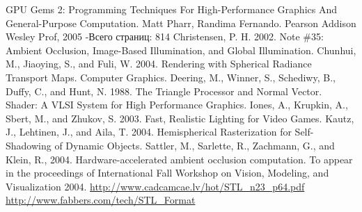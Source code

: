 \clearpage


\setcounter{page}{2} 





\clearpage
\begin{thebibliography}{00}
 GPU Gems 2: Programming Techniques For High-Performance Graphics And General-Purpose Computation. Matt Pharr, Randima Fernando. Pearson Addison Wesley Prof, 2005  -Всего страниц: 814
 Christensen, P. H. 2002. Note \#35: Ambient Occlusion, Image-Based Illumination, and Global Illumination.
 Chunhui, M., Jiaoying, S., and Fuli, W. 2004. Rendering with Spherical Radiance Transport Maps. Computer Graphics.
 Deering, M., Winner, S., Schediwy, B., Duffy, C., and Hunt, N. 1988. The Triangle Processor and Normal Vector. Shader: A VLSI System for High Performance Graphics.
 Iones, A., Krupkin, A., Sbert, M., and Zhukov, S. 2003. Fast, Realistic Lighting for Video Games.
 Kautz, J., Lehtinen, J., and Aila, T.  2004.  Hemispherical Rasterization for Self-Shadowing of Dynamic Objects.
 Sattler, M., Sarlette, R., Zachmann, G., and Klein, R., 2004. Hardware-accelerated ambient occlusion computation. To appear in the proceedings of International Fall Workshop on Vision, Modeling, and Visualization 2004.
 \url{http://www.cadcamcae.lv/hot/STL_n23_p64.pdf}
 \url{http://www.fabbers.com/tech/STL_Format}
\end{thebibliography}




